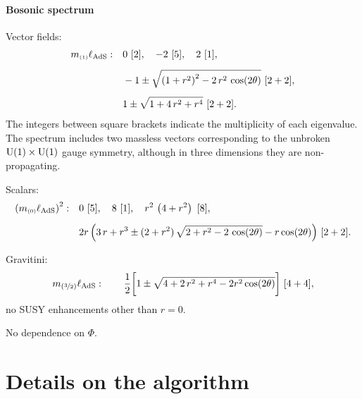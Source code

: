 \documentclass[11pt]{article}
\def\sst#1{{\scriptscriptstyle #1}}
\def\sst#1{{\scriptscriptstyle #1}}
\begin{document}
\paragraph{Bosonic spectrum}
Vector fields:
\begin{equation}
	\begin{aligned}	
		m_{\sst{(1)}}\ell_{\rm AdS}:\quad &
		0\ [2],	\quad
		-2\ [5],	\quad
		2\ [1],	\\[5pt]
		&	-1\pm\sqrt{\left(1+r^2\right)^2-2\,r^2\,\cos(2\theta)}\ [2+2],	\\[5pt]
		&	1\pm\sqrt{1+4\,r^2+r^{4}}\ [2+2].
	\end{aligned}
\end{equation}
The integers between square brackets indicate the multiplicity of each eigenvalue. The spectrum includes two massless vectors corresponding to the unbroken ${\rm U}(1)\times {\rm U}(1)$ gauge symmetry, although in three dimensions they are non-propagating.


Scalars:
\begin{equation}
	\begin{aligned}	
		\left(m_{\sst{(0)}}\ell_{\rm AdS}\right)^2:\quad&
		0\ [5],	\quad
		8\ [1],	\quad
		r^{2}\,\left(4+r^2\right)\ [8],	\\[5pt]
		&	2r\,\Big(3\,r+r^{3}\pm(2+r^{2})\,\sqrt{2+r^2-2\,\cos(2\theta)}-r\cos(2\theta)\Big)\ [2+2].
	\end{aligned}
\end{equation}

Gravitini:
\begin{equation}
	m_{{(\nicefrac32)}}\ell_{\rm AdS}:\quad 
	\quad \dfrac1{2}\bigg[1\pm\sqrt{4+2\,r^{2}+r^{4}-2r^{2}\cos(2\theta)}\bigg]\ [4+4],
\end{equation}
no SUSY enhancements other than $r=0$.

No dependence on $\Phi$.

\newpage
\section{Details on the algorithm}
\end{document}
